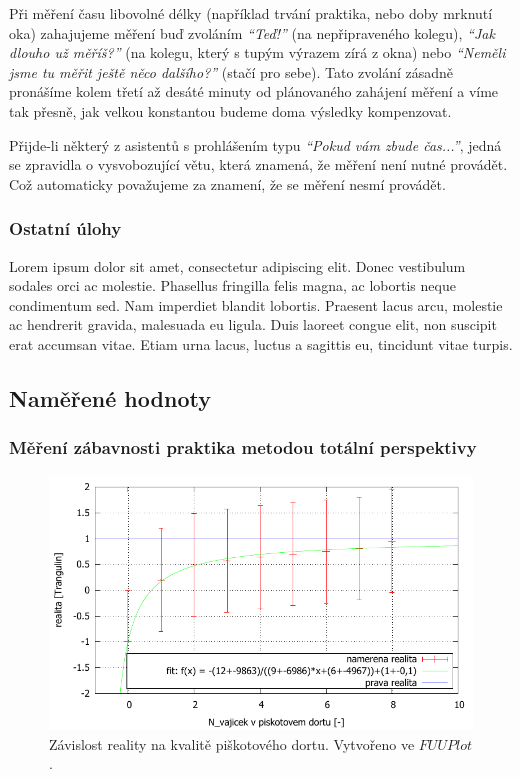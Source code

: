 \documentclass[english]{article}
\begin{document}
Při měření času libovolné délky (například trvání praktika, nebo doby mrknutí oka) zahajujeme měření buď zvoláním \emph{“Teď!”} (na nepřipraveného kolegu), \emph{“Jak dlouho už měříš?”} (na kolegu, který s tupým výrazem zírá z okna) nebo \emph{“Neměli jsme tu měřit ještě něco dalšího?”} (stačí pro sebe). Tato zvolání zásadně pronášíme kolem třetí až desáté minuty od plánovaného zahájení měření a víme tak přesně, jak velkou konstantou budeme doma výsledky kompenzovat.

Přijde-li některý z asistentů s prohlášením typu \emph{“Pokud vám zbude čas...”}, jedná se zpravidla o vysvobozující větu, která znamená, že měření není nutné provádět. Což automaticky považujeme za znamení, že se měření nesmí provádět.

\subsubsection{Ostatní úlohy}
Lorem ipsum dolor sit amet, consectetur adipiscing elit. Donec vestibulum sodales orci ac molestie. Phasellus fringilla felis magna, ac lobortis neque condimentum sed. Nam imperdiet blandit lobortis. Praesent lacus arcu, molestie ac hendrerit gravida, malesuada eu ligula. Duis laoreet congue elit, non suscipit erat accumsan vitae. Etiam urna lacus, luctus a sagittis eu, tincidunt vitae turpis. \cite{bib:ipsum}
\subsection{Naměřené hodnoty}

\subsubsection{Měření zábavnosti praktika metodou totální perspektivy}
	
	\begin{figure}[h]
	\begin{center}
	    \includegraphics[width=\linewidth]{./att/vajicka.pdf}
	    	\caption{Závislost reality na kvalitě piškotového dortu. Vytvořeno ve $FUUPlot$.}
			\label{fig:g_2}
	\end{center}
	\end{figure}
\end{document}
